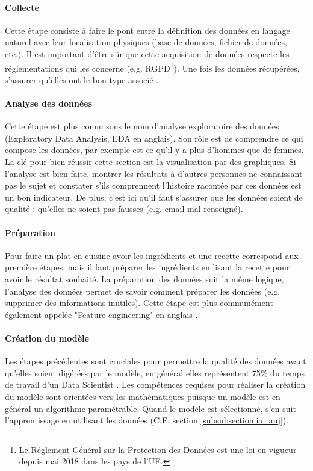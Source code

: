 \documentclass[10pt, french, a4paper]{report}
\begin{document}
\paragraph{Collecte}
Cette étape consiste à faire le pont entre la définition des données en langage naturel avec leur localisation physiques (base de données, fichier de données, etc.). Il est important d'être sûr que cette acquisition de données respecte les réglementations qui les concerne (e.g. RGPD\footnote{Le Réglement Général sur la Protection des Données est une loi en vigueur depuis mai 2018 dans les pays de l'UE.}). Une fois les données récupérées, s'assurer qu'elles ont le bon type associé \citep{mayo_machine_2018}.

\paragraph{Analyse des données}
Cette étape est plus connu sous le nom d'analyse exploratoire des données (Exploratory Data Analysis, EDA en anglais). Son rôle est de comprendre ce qui compose les données, par exemple est-ce qu'il y a plus d'hommes que de femmes. La clé pour bien réussir cette section est la visualisation par des graphiques. Si l'analyse est bien faite, montrer les résultats à d'autres personnes ne connaissant pas le sujet et constater s'ils comprennent l'histoire racontée par ces données est un bon indicateur. De plus, c'est ici qu'il faut s'assurer que les données soient de qualité : qu'elles ne soient pas fausses (e.g. email mal renseigné).

\paragraph{Préparation}
Pour faire un plat en cuisine avoir les ingrédients et une recette correspond aux première étapes, mais il faut préparer les ingrédients en lisant la recette pour avoir le résultat souhaité. La préparation des données suit la même logique, l'analyse des données permet de savoir comment préparer les données (e.g. supprimer des informations inutiles). Cette étape est plus communément également appelée "Feature engineering" en anglais \citep{mayo_machine_2018}.

\paragraph{Création du modèle}
Les étapes précédentes sont cruciales pour permettre la qualité des données avant qu'elles soient digérées par le modèle, en général elles représentent 75\% du temps de travail d'un Data Scientist \citep{figure_eight_state_2019}. Les compétences requises pour réaliser la création du modèle sont orientées vers les mathématiques puisque un modèle est en général un algorithme paramétrable. Quand le modèle est sélectionné, s'en suit l'apprentissage en utilisant les données (C.F. section \ref{subsubsection:ia_auj}).
\end{document}
